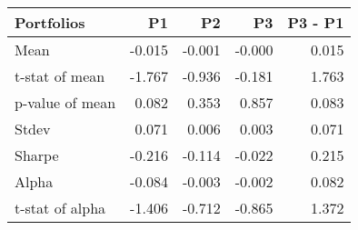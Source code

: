 \begin{tabular}{lrrrr}
\toprule
Portfolios & P1 & P2 & P3 & P3 - P1 \\
\midrule
Mean & -0.015 & -0.001 & -0.000 & 0.015 \\
t-stat of mean & -1.767 & -0.936 & -0.181 & 1.763 \\
p-value of mean & 0.082 & 0.353 & 0.857 & 0.083 \\
Stdev & 0.071 & 0.006 & 0.003 & 0.071 \\
Sharpe & -0.216 & -0.114 & -0.022 & 0.215 \\
Alpha & -0.084 & -0.003 & -0.002 & 0.082 \\
t-stat of alpha & -1.406 & -0.712 & -0.865 & 1.372 \\
\bottomrule
\end{tabular}
